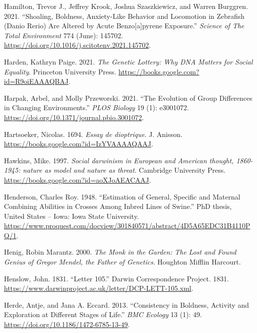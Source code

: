 \documentclass[
]{book}
\newlength{\cslhangindent}
\newlength{\cslentryspacingunit} %
\newenvironment{CSLReferences}[2] %
 {%
  \setlength{\parindent}{0pt}
  \ifodd #1
  \let\oldpar\par
  \def\par{\hangindent=\cslhangindent\oldpar}
  \fi
  \setlength{\parskip}{#2\cslentryspacingunit}
 }%
 {}
\begin{document}
\begin{CSLReferences}{1}{0}
\leavevmode{}%
Hamilton, Trevor J., Jeffrey Krook, Joshua Szaszkiewicz, and Warren Burggren. 2021. {``Shoaling, Boldness, Anxiety-Like Behavior and Locomotion in Zebrafish ({Danio} Rerio) Are Altered by Acute Benzo{[}a{]}pyrene Exposure.''} \emph{Science of The Total Environment} 774 (June): 145702. \url{https://doi.org/10.1016/j.scitotenv.2021.145702}.

\leavevmode{}%
Harden, Kathryn Paige. 2021. \emph{The {Genetic Lottery}: {Why DNA Matters} for {Social Equality}}. {Princeton University Press}. \url{https://books.google.com?id=R9oiEAAAQBAJ}.

\leavevmode{}%
Harpak, Arbel, and Molly Przeworski. 2021. {``The Evolution of Group Differences in Changing Environments.''} \emph{PLOS Biology} 19 (1): e3001072. \url{https://doi.org/10.1371/journal.pbio.3001072}.

\leavevmode{}%
Hartsoeker, Nicolas. 1694. \emph{Essay de dioptrique}. {J. Anisson}. \url{https://books.google.com?id=IzYVAAAAQAAJ}.

\leavevmode{}%
Hawkins, Mike. 1997. \emph{Social darwinism in European and American thought, 1860-1945: nature as model and nature as threat}. {Cambridge University Press}. \url{https://books.google.com?id=aoXJoAEACAAJ}.

\leavevmode{}%
Henderson, Charles Roy. 1948. {``Estimation of General, Specific and Maternal Combining Abilities in Crosses Among Inbred Lines of Swine.''} PhD thesis, {United States -- Iowa}: {Iowa State University}. \url{https://www.proquest.com/docview/301840571/abstract/4D5A65EDC31B4110PQ/1}.

\leavevmode{}%
Henig, Robin Marantz. 2000. \emph{The {Monk} in the {Garden}: {The Lost} and {Found Genius} of {Gregor Mendel}, the {Father} of {Genetics}}. {Houghton Mifflin Harcourt}.

\leavevmode{}%
Henslow, John. 1831. {``Letter 105.''} {Darwin Correspondence Project}. 1831. \url{https://www.darwinproject.ac.uk/letter/DCP-LETT-105.xml}.

\leavevmode{}%
Herde, Antje, and Jana A. Eccard. 2013. {``Consistency in Boldness, Activity and Exploration at Different Stages of Life.''} \emph{BMC Ecology} 13 (1): 49. \url{https://doi.org/10.1186/1472-6785-13-49}.


\end{CSLReferences}
\end{document}
